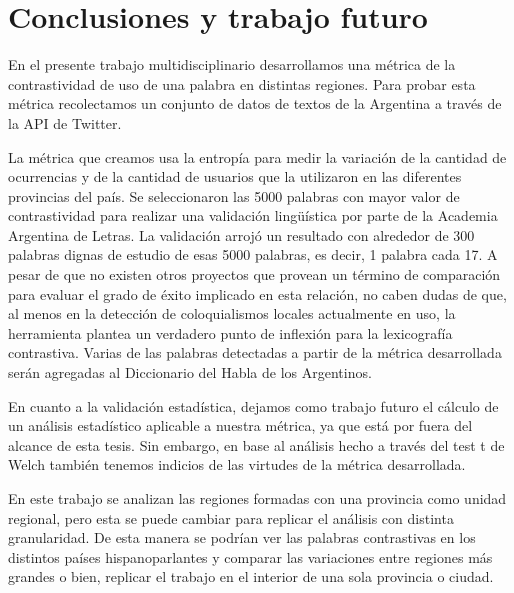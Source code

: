 \section{Conclusiones y trabajo futuro}
En el presente trabajo multidisciplinario desarrollamos una métrica de la contrastividad de uso de una palabra en distintas regiones. Para probar esta métrica recolectamos un conjunto de datos de textos de la Argentina a través de la API de Twitter.

La métrica que creamos usa la entropía para medir la variación de la cantidad de ocurrencias y de la cantidad de usuarios que la utilizaron en las diferentes provincias del país. Se seleccionaron las 5000 palabras con mayor valor de contrastividad para realizar una validación lingüística por parte de la Academia Argentina de Letras. La validación arrojó un resultado con alrededor de 300 palabras dignas de estudio de esas 5000 palabras, es decir, 1 palabra cada 17. 
A pesar de que no existen otros proyectos que provean un término de comparación para evaluar el grado de éxito implicado en esta relación, no caben dudas de que, al menos en la detección de coloquialismos locales actualmente en uso, la herramienta plantea un verdadero punto de inflexión para la lexicografía contrastiva.
Varias de las palabras detectadas a partir de la métrica desarrollada serán agregadas al Diccionario del Habla de los Argentinos.

En cuanto a la validación estadística, dejamos como trabajo futuro el cálculo de un análisis estadístico aplicable a nuestra métrica, ya que está por fuera del alcance de esta tesis. Sin embargo, en base al análisis hecho a través del test t de Welch también tenemos indicios de las virtudes de la métrica desarrollada. 

En este trabajo se analizan las regiones formadas con una provincia como unidad regional, pero esta se puede cambiar para replicar el análisis con distinta granularidad. De esta manera se podrían ver las palabras contrastivas en los distintos países hispanoparlantes y comparar las variaciones entre regiones más grandes o bien, replicar el trabajo en el interior de una sola provincia o ciudad.



